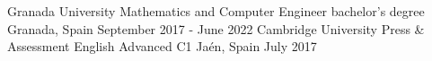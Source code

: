 

\begin{cventries}

  \cventry
    {Granada University} %
    {Mathematics and Computer Engineer bachelor's degree} %
    {Granada, Spain} %
    {September 2017 - June 2022} %
    {
    }
  \cventry
    {Cambridge University Press \& Assessment English} %
    {Advanced C1} %
    {Jaén, Spain} %
    {July 2017} %
    {}
\end{cventries}
